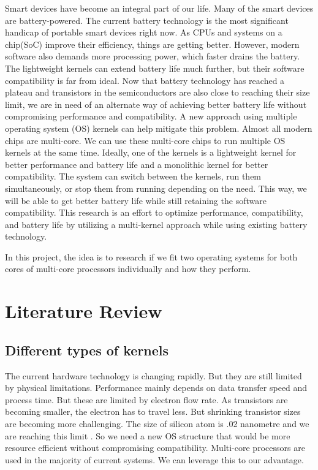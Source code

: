 \documentclass[11pt]{article}       %
\begin{document}
Smart devices have become an integral part of our life. Many of the smart devices are battery-powered. The current battery technology is the most significant handicap of portable smart devices right now. As CPUs and systems on a chip(SoC) improve their efficiency, things are getting better. However, modern software also demands more processing power, which faster drains the battery. The lightweight kernels can extend battery life much further, but their software compatibility is far from ideal. Now that battery technology has reached a plateau and transistors in the semiconductors are also close to reaching their size limit, we are in need of an alternate way of achieving better battery life without compromising performance and compatibility. A new approach using multiple operating system (OS) kernels can help mitigate this problem. Almost all modern chips are multi-core. We can use these multi-core chips to run multiple OS kernels at the same time. Ideally, one of the kernels is a lightweight kernel for better performance and battery life and a monolithic kernel for better compatibility. The system can switch between the kernels, run them simultaneously, or stop them from running depending on the need. This way, we will be able to get better battery life while still retaining the software compatibility. This research is an effort to optimize performance, compatibility, and battery life by utilizing a multi-kernel approach while using existing battery technology. 

In this project, the idea is to research if we fit two operating systems for both cores of multi-core processors individually and how they perform.

\section{Literature Review} \label{litrev}

\subsection{Different types of kernels}
The current hardware technology is changing rapidly. But they are still limited by physical limitations. Performance mainly depends on data transfer speed and process time. But these are limited by electron flow rate\cite{DEL17}. As transistors are becoming smaller, the electron has to travel less. But shrinking transistor sizes are becoming more challenging. The size of silicon atom is .02 nanometre and we are reaching this limit \cite{DEL19}. So we need a new OS structure that would be more resource efficient without compromising compatibility. Multi-core processors are used in the majority of current systems. We can leverage this to our advantage.\\
\end{document}
